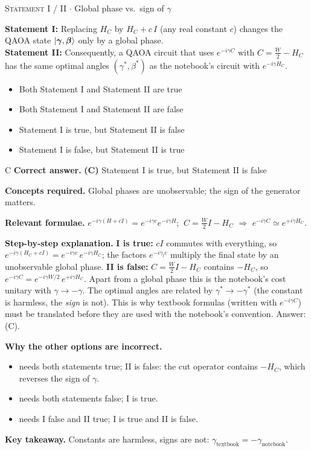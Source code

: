 \documentclass[11pt,a4paper]{article}
\newcommand{\optlabel}[1]{\textbf{(#1)}}
\newcommand{\correctlabel}[1]{\textcolor{okgreen}{\textbf{(#1)}\,\ding{51}}}
\newenvironment{qitem}[1]{\begin{list}{}{\setlength{\leftmargin}{3.3em}\setlength{\labelwidth}{3.1em}%
  \setlength{\labelsep}{0.2em}\setlength{\topsep}{3pt}\setlength{\parsep}{3pt}}\item[\textbf{Q.#1}\hfill]}{\end{list}}
\newcommand{\qsep}{\par\vspace{2pt}{\color{black!15}\hrule}\vspace{4pt}}
\newcommand{\qmeta}[2]{{\footnotesize\color{black!60}\textsc{#1} \;$\cdot$\; #2}\par}
\begin{document}
\begin{qitem}{29}
\qmeta{Statement I / II}{Global phase vs.\ sign of $\gamma$}
\textbf{Statement I:} Replacing $H_C$ by $H_C + c\,I$ (any real constant $c$) changes the QAOA state
$\ket{\boldsymbol\gamma, \boldsymbol\beta}$ only by a global phase.\\[1mm]
\textbf{Statement II:} Consequently, a QAOA circuit that uses $e^{-i\gamma C}$ with $C = \tfrac W2 - H_C$ has the same optimal
angles $(\gamma^*, \beta^*)$ as the notebook's circuit with $e^{-i\gamma H_C}$.
\begin{itemize}[leftmargin=2.6em, labelsep=0.4em, itemsep=2pt, topsep=3pt]
\item[\optlabel{A}] Both Statement I and Statement II are true
\item[\optlabel{B}] Both Statement I and Statement II are false
\item[\correctlabel{C}] Statement I is true, but Statement II is false
\item[\optlabel{D}] Statement I is false, but Statement II is true
\end{itemize}
\end{qitem}
\begin{solbox}{C}
\textbf{\color{brand}Correct answer.} \textcolor{okgreen}{\textbf{(C)}} Statement I is true, but Statement II is false

\textbf{\color{brand}Concepts required.} Global phases are unobservable; the sign of the generator matters.

\textbf{\color{brand}Relevant formulae.} $e^{-i\gamma(H + cI)} = e^{-i\gamma c}e^{-i\gamma H}$; $\ C = \tfrac W2 I - H_C$ $\Rightarrow$ $e^{-i\gamma C} \simeq e^{+i\gamma H_C}$.

\textbf{\color{brand}Step-by-step explanation.} \textbf{I is true:} $cI$ commutes with everything, so $e^{-i\gamma(H_C + cI)} = e^{-i\gamma c}\,e^{-i\gamma H_C}$; the factors
$e^{-i\gamma_l c}$ multiply the final state by an unobservable global phase.
\textbf{II is false:} $C = \tfrac W2 I - H_C$ contains $-H_C$, so $e^{-i\gamma C} = e^{-i\gamma W/2}\,e^{+i\gamma H_C}$. Apart from a global phase
this is the notebook's cost unitary with $\gamma \to -\gamma$. The optimal angles are related by $\gamma^* \to -\gamma^*$ (the
constant is harmless, the \emph{sign} is not). This is why textbook formulas (written with $e^{-i\gamma C}$) must be translated
before they are used with the notebook's convention. Answer: (C).

\textbf{\color{brand}Why the other options are incorrect.}
\begin{itemize}[leftmargin=2.4em, itemsep=1pt, topsep=2pt]
\item[\textbf{(A)}] needs both statements true; II is false: the cut operator contains $-H_C$, which reverses the sign of $\gamma$.
\item[\textbf{(B)}] needs both statements false; I is true.
\item[\textbf{(D)}] needs I false and II true; I is true and II is false.
\end{itemize}
\textbf{\color{brand}Key takeaway.} Constants are harmless, signs are not: $\gamma_{\text{textbook}} = -\gamma_{\text{notebook}}$.
\end{solbox}
\qsep
\end{document}
